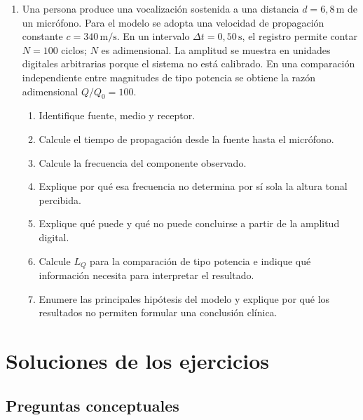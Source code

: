 \begin{enumerate}[label=\textbf{I\arabic*.},leftmargin=*]
    \item Una persona produce una vocalización sostenida a una distancia \(d=6{,}8\,\text{m}\) de un micrófono. Para el modelo se adopta una velocidad de propagación constante \(c=340\,\text{m}/\text{s}\). En un intervalo \(\Delta t=0{,}50\,\text{s}\), el registro permite contar \(N=100\) ciclos; \(N\) es adimensional. La amplitud se muestra en unidades digitales arbitrarias porque el sistema no está calibrado. En una comparación independiente entre magnitudes de tipo potencia se obtiene la razón adimensional \(Q/Q_0=100\).
    \begin{enumerate}[label=\alph*)]
        \item Identifique fuente, medio y receptor.
        \item Calcule el tiempo de propagación desde la fuente hasta el micrófono.
        \item Calcule la frecuencia del componente observado.
        \item Explique por qué esa frecuencia no determina por sí sola la altura tonal percibida.
        \item Explique qué puede y qué no puede concluirse a partir de la amplitud digital.
        \item Calcule \(L_Q\) para la comparación de tipo potencia e indique qué información necesita para interpretar el resultado.
        \item Enumere las principales hipótesis del modelo y explique por qué los resultados no permiten formular una conclusión clínica.
    \end{enumerate}
\end{enumerate}

\section{Soluciones de los ejercicios}
\label{sec:u1-soluciones}

\subsection*{Preguntas conceptuales}

